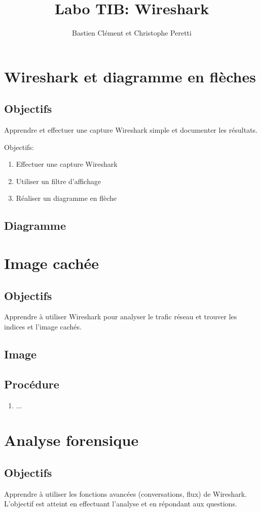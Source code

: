 \documentclass[11pt,a4paper]{article}
\title{Labo TIB: Wireshark}
\author{Bastien Clément et Christophe Peretti}
\begin{document}
\maketitle

\section{Wireshark et diagramme en flèches}

\subsection{Objectifs}
Apprendre et effectuer une capture Wireshark simple et documenter les résultats.

Objectifs:
\begin{enumerate}
  \item Effectuer une capture Wireshark
  \item Utiliser un filtre d'affichage
  \item Réaliser un diagramme en flèche
\end{enumerate}

\subsection{Diagramme}

\section{Image cachée}

\subsection{Objectifs}

Apprendre à utiliser Wireshark pour analyser le trafic réseau et trouver les indices et l'image cachés.

\subsection{Image}

\subsection{Procédure}

\begin{enumerate}
  \item ...
\end{enumerate}


\section{Analyse forensique}

\subsection{Objectifs}

Apprendre à utiliser les fonctions avancées (conversations, flux) de Wireshark. L'objectif est atteint en effectuant l'analyse et en répondant aux questions.
\end{document}
